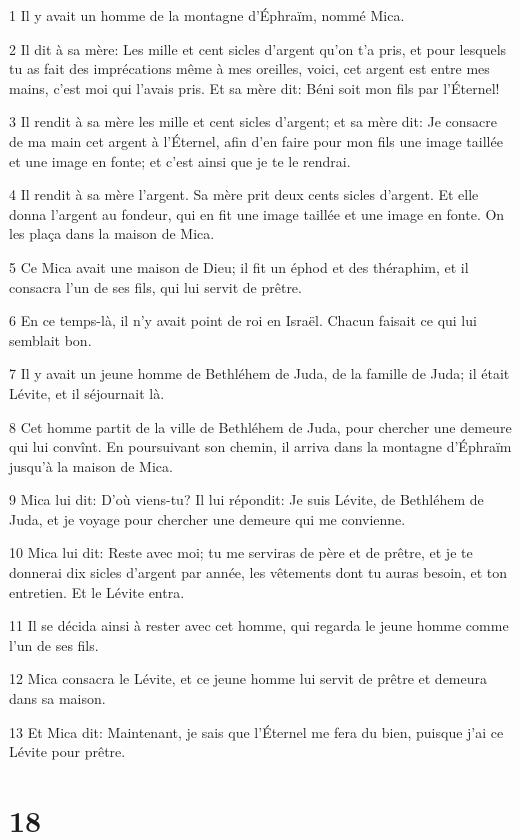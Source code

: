 \par 1 Il y avait un homme de la montagne d'Éphraïm, nommé Mica.
\par 2 Il dit à sa mère: Les mille et cent sicles d'argent qu'on t'a pris, et pour lesquels tu as fait des imprécations même à mes oreilles, voici, cet argent est entre mes mains, c'est moi qui l'avais pris. Et sa mère dit: Béni soit mon fils par l'Éternel!
\par 3 Il rendit à sa mère les mille et cent sicles d'argent; et sa mère dit: Je consacre de ma main cet argent à l'Éternel, afin d'en faire pour mon fils une image taillée et une image en fonte; et c'est ainsi que je te le rendrai.
\par 4 Il rendit à sa mère l'argent. Sa mère prit deux cents sicles d'argent. Et elle donna l'argent au fondeur, qui en fit une image taillée et une image en fonte. On les plaça dans la maison de Mica.
\par 5 Ce Mica avait une maison de Dieu; il fit un éphod et des théraphim, et il consacra l'un de ses fils, qui lui servit de prêtre.
\par 6 En ce temps-là, il n'y avait point de roi en Israël. Chacun faisait ce qui lui semblait bon.
\par 7 Il y avait un jeune homme de Bethléhem de Juda, de la famille de Juda; il était Lévite, et il séjournait là.
\par 8 Cet homme partit de la ville de Bethléhem de Juda, pour chercher une demeure qui lui convînt. En poursuivant son chemin, il arriva dans la montagne d'Éphraïm jusqu'à la maison de Mica.
\par 9 Mica lui dit: D'où viens-tu? Il lui répondit: Je suis Lévite, de Bethléhem de Juda, et je voyage pour chercher une demeure qui me convienne.
\par 10 Mica lui dit: Reste avec moi; tu me serviras de père et de prêtre, et je te donnerai dix sicles d'argent par année, les vêtements dont tu auras besoin, et ton entretien. Et le Lévite entra.
\par 11 Il se décida ainsi à rester avec cet homme, qui regarda le jeune homme comme l'un de ses fils.
\par 12 Mica consacra le Lévite, et ce jeune homme lui servit de prêtre et demeura dans sa maison.
\par 13 Et Mica dit: Maintenant, je sais que l'Éternel me fera du bien, puisque j'ai ce Lévite pour prêtre.

\chapter{18}

